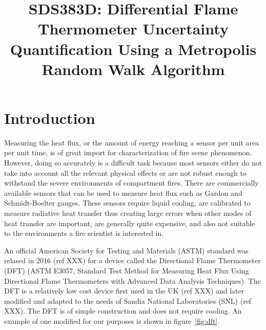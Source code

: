 \documentclass[article]{proc}
\begin{document}


\title{SDS383D: Differential Flame Thermometer Uncertainty Quantification Using a Metropolis Random Walk Algorithm}



\address[1]{Department of Mechanical Engineering, The University of Texas at Austin, Austin, TX 78712}




\maketitle
\section{Introduction}

    Measuring the heat flux, or the amount of energy reaching a sensor per unit area per unit time, is of great import for characterization of fire scene phenomenon. However, doing so accurately is a difficult task because most sensors either do not take into account all the relevant physical effects or are not robust enough to withstand the severe environments of compartment fires. There are commercially available sensors that can be used to measure heat flux such as Gardon and Schmidt-Boelter gauges. These sensors require liquid cooling, are calibrated to measure radiative heat transfer thus creating large errors when other modes of heat transfer are important, are generally quite expensive, and also not suitable to the environments a fire scientist is interested in. 

    An official American Society for Testing and Materials (ASTM) standard was relased in 2016 (ref XXX) for a device called the Directional Flame Thermometer (DFT) (ASTM E3057, Standard Test Method for Measuring Heat Flux Using Directional Flame Thermometers with Advanced Data Analysis Techniques). The DFT is a relatively low cost device first used in the UK (ref XXX) and later modified and adapted to the needs of Sandia National Laboratories (SNL) (ref XXX). The DFT is of simple construction and does not require cooling. An example of one modified for our purposes is shown in figure~\ref{fig:dft}. 
\end{document}
